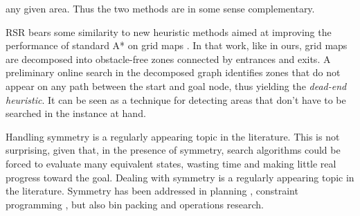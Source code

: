 any given area.
Thus the two methods are in some sense complementary.
\par
RSR bears some similarity to new heuristic methods aimed at improving the 
performance of standard A* on grid maps \cite{bjornsson06}.
In that work, like in ours, grid maps are decomposed into obstacle-free zones connected by entrances 
and exits.
A preliminary online search in the decomposed graph identifies zones that do not appear 
on any path between the start and goal node, thus yielding the \emph{dead-end heuristic}.
It can be seen as a technique for detecting areas that don't have to be searched
in the instance at hand.

Handling symmetry is a regularly appearing topic in the literature.
This is not surprising, given that,
in the presence of symmetry, search algorithms could be forced to evaluate 
many equivalent states, wasting time and making little real progress toward the
goal.
Dealing with symmetry is a regularly appearing topic in the literature. 
Symmetry has been addressed in planning \cite{},
constraint programming \cite{},
but also bin packing and operations research. 



